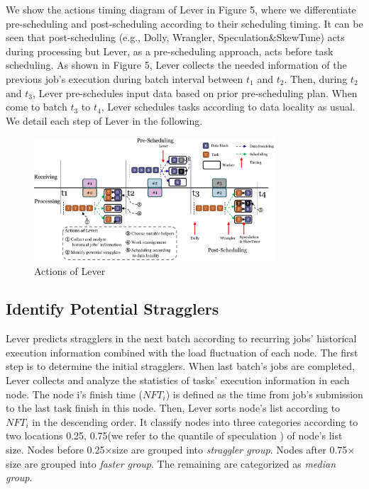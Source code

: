 \documentclass[10pt,conference,compsocconf,letterpaper]{IEEEtran}
\begin{document}
  We show the actions timing diagram of Lever in Figure 5, where we differentiate pre-scheduling and post-scheduling according to their scheduling timing. It can be seen that post-scheduling (e.g., Dolly, Wrangler, Speculation\&SkewTune) acts during processing but Lever, as a pre-scheduling approach, acts before task scheduling. As shown in Figure 5, Lever collects the needed information of the previous job's execution during batch interval between $t_1$ and $t_2$.
  Then, during $t_2$ and $t_3$, Lever pre-schedules input data based on prior pre-scheduling plan. When come to batch $t_3$ to $t_4$, Lever schedules tasks according to data locality as usual. We detail each step of Lever in the following.
  \begin{figure}[htbp]
    \centering
    \includegraphics[width=0.8\textwidth]{FigureAction}
    \caption{Actions of Lever}
    \label{Fig. 5:}
  \end{figure}

\subsection{Identify Potential Stragglers}

  Lever predicts stragglers in the next batch according to recurring jobs' historical execution information combined with the load fluctuation of each node. The first step is to determine the initial stragglers. When last batch's jobs are completed, Lever collects and analyze the statistics of tasks' execution information in each node. The node i's finish time ($NFT_i$) is defined as the time from job's submission to the last task finish in this node. Then, Lever sorts node's list according to $NFT_i$ in the descending order. It classify nodes into three categories according to two locations 0.25, 0.75(we refer to the quantile of speculation \cite{Dean2004}) of node's list size. Nodes before 0.25$\times$size are grouped into \emph{straggler group}. Nodes after 0.75$\times$size are grouped into \emph{faster group}. The remaining are categorized as \emph{median group}.
\end{document}
